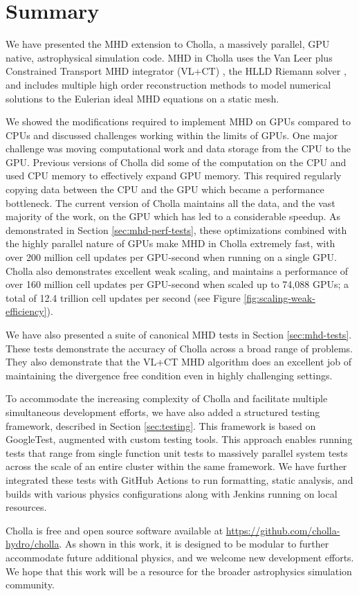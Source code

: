 \section{Summary}
\label{sec:summary}

We have presented the MHD extension to Cholla, a massively parallel, GPU native, astrophysical simulation code. MHD in Cholla uses the Van Leer plus Constrained Transport MHD integrator (VL+CT) \citep{stone_2009}, the HLLD Riemann solver \citep{hlld_2005}, and includes multiple high order reconstruction methods to model numerical solutions to the Eulerian ideal MHD equations on a static mesh.

We showed the modifications required to implement MHD on GPUs compared to CPUs and discussed challenges working within the limits of GPUs. One major challenge was moving computational work and data storage from the CPU to the GPU. Previous versions of Cholla did some of the computation on the CPU and used CPU memory to effectively expand GPU memory. This required regularly copying data between the CPU and the GPU which became a performance bottleneck. The current version of Cholla maintains all the data, and the vast majority of the work, on the GPU which has led to a considerable speedup. As demonstrated in Section \ref{sec:mhd-perf-tests}, these optimizations combined with the highly parallel nature of GPUs make MHD in Cholla extremely fast, with over 200 million cell updates per GPU-second when running on a single GPU. Cholla also demonstrates excellent weak scaling, and maintains a performance of over 160 million cell updates per GPU-second when scaled up to 74,088 GPUs; a total of 12.4 trillion cell updates per second (see Figure \ref{fig:scaling-weak-efficiency}).

We have also presented a suite of canonical MHD tests in Section \ref{sec:mhd-tests}. These tests demonstrate the accuracy of Cholla across a broad range of problems. They also demonstrate that the VL+CT MHD algorithm does an excellent job of maintaining the divergence free condition even in highly challenging settings. 

To accommodate the increasing complexity of Cholla and facilitate multiple simultaneous development efforts, we have also added a structured testing framework, described in Section \ref{sec:testing}. This framework is based on GoogleTest, augmented with custom testing tools. This approach enables running tests that range from single function unit tests to massively parallel system tests across the scale of an entire cluster within the same framework. We have further integrated these tests with GitHub Actions to run formatting, static analysis, and builds with various physics configurations along with Jenkins running on local resources.

Cholla is free and open source software available at \url{https://github.com/cholla-hydro/cholla}. As shown in this work, it is designed to be modular to further accommodate future additional physics, and we welcome new development efforts. We hope that this work will be a resource for the broader astrophysics simulation community.
